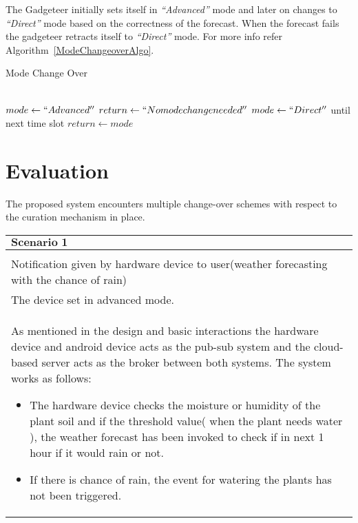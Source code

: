 \documentclass[10pt]{article}
\begin{document}
The Gadgeteer initially sets itself in \emph{``Advanced''} mode and later on changes to \emph{``Direct''} mode based on the correctness of the forecast.
When the forecast fails the gadgeteer retracts itself to \emph{``Direct''} mode. 
For more info refer Algorithm~\ref{ModeChangeoverAlgo}.

\begin{algorithm}
\caption{Mode Change Over}          %
\label{ModeChangeoverAlgo}      
\begin{algorithmic}
\\
\State $mode \gets ``Advanced''$
    \State $return \gets``No mode change needed''$
\Else
    \State $mode \gets ``Direct''$ until next time slot
\EndIf
\State $return \gets mode$
\end{algorithmic}
\end{algorithm} 


\section*{Evaluation}

The proposed system encounters multiple change-over schemes with respect to the curation mechanism in place.\\

\begin{longtable}{p{}}%
\hline
$\textbf{Scenario 1}$  \\
\hline    \\
Notification given by hardware device to user(weather forecasting with the chance of rain)\\
The device set in advanced mode.\\
As mentioned in the design and basic interactions the hardware device and android device acts as the pub-sub system and the cloud- based server acts as the broker between both systems. The system works as follows:
\begin{itemize}
\item
The hardware device checks the moisture or humidity of the plant soil and if the threshold value( when the plant needs water ), the weather forecast has been invoked to check if in next 1 hour if it would rain or not.
\item
If there is chance of rain, the event for watering the plants has not been triggered.
\end{itemize}\\


\hline
\end{longtable}
\end{document}
